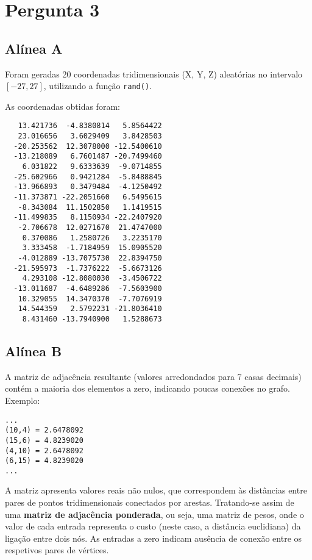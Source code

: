 \chapter{Pergunta 3}
\section*{Alínea A}

Foram geradas 20 coordenadas tridimensionais (X, Y, Z) aleatórias no intervalo \([-27, 27]\), utilizando a função \texttt{rand()}.

As coordenadas obtidas foram:

\begin{verbatim}
   13.421736  -4.8380814   5.8564422
   23.016656   3.6029409   3.8428503
  -20.253562  12.3078000 -12.5400610
  -13.218089   6.7601487 -20.7499460
    6.031822   9.6333639  -9.0714855
  -25.602966   0.9421284  -5.8488845
  -13.966893   0.3479484  -4.1250492
  -11.373871 -22.2051660   6.5495615
   -8.343084  11.1502850   1.1419515
  -11.499835   8.1150934 -22.2407920
   -2.706678  12.0271670  21.4747000
    0.370086   1.2580726   3.2235170
    3.333458  -1.7184959  15.0905520
   -4.012889 -13.7075730  22.8394750
  -21.595973  -1.7376222  -5.6673126
    4.293108 -12.8080030  -3.4506722
  -13.011687  -4.6489286  -7.5603900
   10.329055  14.3470370  -7.7076919
   14.544359   2.5792231 -21.8036410
    8.431460 -13.7940900   1.5288673
\end{verbatim}

\section*{Alínea B}

A matriz de adjacência resultante (valores arredondados para 7 casas decimais) contém a maioria dos elementos a zero, indicando poucas conexões no grafo. Exemplo:

\begin{verbatim}
... 
(10,4) = 2.6478092
(15,6) = 4.8239020
(4,10) = 2.6478092
(6,15) = 4.8239020
...
\end{verbatim}
\medskip

\noindent
A matriz apresenta valores reais não nulos, que correspondem às distâncias entre pares de pontos tridimensionais conectados por arestas. Tratando-se assim de uma \textbf{matriz de adjacência ponderada}, ou seja, uma matriz de pesos, onde o valor de cada entrada representa o custo (neste caso, a distância euclidiana) da ligação entre dois nós. As entradas a zero indicam ausência de conexão entre os respetivos pares de vértices.


